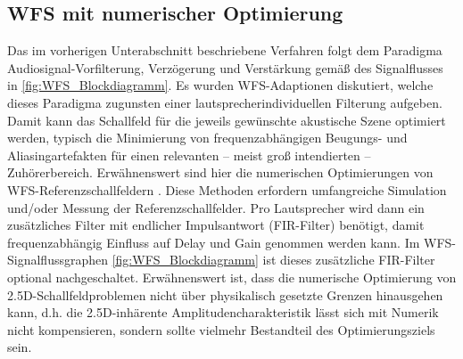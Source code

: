 \subsection{WFS mit numerischer Optimierung}
%
Das im vorherigen Unterabschnitt beschriebene Verfahren folgt dem
Paradigma Audiosignal-Vorfilterung, Verzögerung und Verstärkung gemäß des
Signalflusses in \Abb\ref{fig:WFS_Blockdiagramm}.
%
Es wurden WFS-Adaptionen diskutiert, welche dieses Paradigma zugunsten einer
lautsprecherindividuellen Filterung aufgeben.
%
Damit kann das Schallfeld für die jeweils gewünschte akustische Szene optimiert
werden, typisch die Minimierung von frequenzabhängigen
Beugungs- und Aliasingartefakten für einen relevanten -- meist groß intendierten
 -- Zuhörerbereich.
%
Erwähnenswert sind hier die numerischen Optimierungen
von WFS-Referenzschallfeldern \cite{Gauthier2006_JASA,Gauthier2007_JAES,Corteel2006_JAES}.
%
Diese Methoden erfordern umfangreiche Simulation und/oder Messung der
Referenzschallfelder.
%
Pro Lautsprecher wird dann ein zusätzliches Filter
mit endlicher Impulsantwort (FIR-Filter) benötigt, damit frequenzabhängig
Einfluss auf Delay und Gain genommen werden kann.
%
Im WFS-Signalflussgraphen \Abb\ref{fig:WFS_Blockdiagramm} ist dieses zusätzliche
FIR-Filter optional nachgeschaltet.
%
%
Erwähnenswert ist, dass die numerische Optimierung von 2.5D-Schallfeldproblemen
nicht über physikalisch gesetzte Grenzen hinausgehen kann, d.h.
die 2.5D-inhärente Amplitudencharakteristik lässt sich mit Numerik nicht
kompensieren, sondern sollte vielmehr Bestandteil des Optimierungsziels sein.



